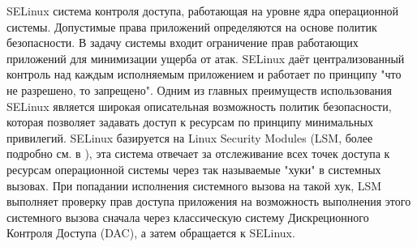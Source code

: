 SELinux система контроля доступа, работающая на уровне ядра операционной
системы. Допустимые права приложений определяются на основе политик
безопасности. В задачу системы входит ограничение прав работающих
приложений для минимизации ущерба от атак. SELinux даёт централизованный
контроль над каждым исполняемым приложением и работает по принципу "что
не разрешено, то запрещено". Одним из главных преимуществ использования
SELinux является широкая описательная возможность политик безопасности,
которая позволяет задавать доступ к ресурсам по принципу минимальных
привилегий. SELinux базируется на Linux Security Modules (LSM, более
подробно см. в \cite{LSM}), эта система отвечает за отслеживание всех
точек доступа к ресурсам операционной системы через так называемые
"хуки" в системных вызовах.  При попадании исполнения системного вызова
на такой хук, LSM выполняет проверку прав доступа приложения на
возможность выполнения этого системного вызова сначала через
классическую систему Дискреционного Контроля Доступа (DAC), а затем
обращается к SELinux.

